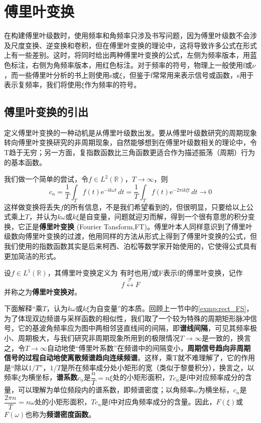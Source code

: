 \section{傅里叶变换}\label{sec:Fourier}

在构建傅里叶级数时，使用频率和角频率只涉及书写问题，因为傅里叶级数不会涉及尺度变换、逆变换和卷积，但在傅里叶变换的理论中，这将导致许多公式在形式上有一些差别。这时，将同时给出两种傅里叶变换的公式，左侧为频率版本，用蓝色标注，右侧为角频率版本，用红色标注。对于频率的符号，物理上一般使用f或$\nu $，而一些傅里叶分析的书上则使用s或$\xi$，但鉴于f常常用来表示信号或函数，s用于表示复频率，我们将使用$\xi$作为频率的符号。

\subsection{傅里叶变换的引出}\label{sub:introduction_of_fourier}
定义傅里叶变换的一种动机是从傅里叶级数出发。要从傅里叶级数研究的周期现象转向傅里叶变换研究的非周期现象，自然能够想到在傅里叶级数相关的理论中，令T趋于无穷；另一方面，复指数函数比三角函数更适合作为描述振荡（周期）行为的基本函数。

我们做一个简单的尝试，令$f\in L^2(\mathbb{R})$，$T\to \infty$，则
\[c_n=\frac{1}{T}\int_{T}f(t)\mathrm{e}^{-\mathrm{i}k\omega t}\,dt=\frac{1}{T}\int_{T}f(t)\mathrm{e}^{-2\pi \mathrm{i}k\xi t}\,dt\to 0\]
这样做变换将丢失$f$的所有信息，不是我们希望看到的，但很明显，只要给以上公式乘上$T$，并认为$k\omega$或$k\xi$是自变量，问题就迎刃而解，得到一个很有意思的积分变换，它正是\textbf{傅里叶变换} (Fourier Tansform,FT)。傅里叶本人同样意识到了傅里叶级数向傅里叶变换的过渡，他用同样的方法从形式上得到了傅里叶变换的公式，但我们使用的指数函数其实是后来柯西、泊松等数学家开始使用的，它使得公式具有更加简洁的形式。

\begin{definition}[傅里叶变换]
    设$f\in L^1(\mathbb{R})$，其傅里叶变换定义为
    有时也用$\hat{f}$或F表示f的傅里叶变换，记作
    \[f\overset{\mathcal{F} }{\longleftrightarrow}F\]
    并称之为\textbf{傅里叶变换对}。
\end{definition}

下面解释“乘$T$，认为$k\omega$或$k\xi$为自变量”的本质。回顾上一节中的\cref{exmp:rect_FS}，为了体现双边频谱与采样函数的相似性，我们取了一个较为特殊的周期矩形脉冲信号，它的基波角频率应为图中两相邻竖直线间的间隔，即\textbf{谱线间隔}，可见其频率极小、周期极大，与我们研究非周期现象所用到的极限情况$T\to\infty$是一致的，换言之，令$T\to\infty$自动地使“傅里叶系数”在频谱中的间隔变小，\textbf{周期信号趋向非周期信号的过程自动地使离散频谱趋向连续频谱}。这样，乘T就不难理解了，它的作用是“除以$1/T$”，$1/T$是所在频率成分处小矩形的宽（类似于黎曼积分），换言之，以频率$\xi$为横坐标，\textbf{谱系数}$c_n$是$\dfrac{n}{T}=n\xi$处的小矩形面积，$Tc_n$是f中对应频率成分的含量，可以理解为单位频段内的谱系数，即频谱密度；以角频率$\omega$为横坐标，$c_n$是$\dfrac{2\pi n}{T}=n\omega$处的小矩形面积，$Tc_n$是f中对应角频率成分的含量。因此，$F(\xi)$或$F(\omega)$也称为\textbf{频谱密度函数}。

